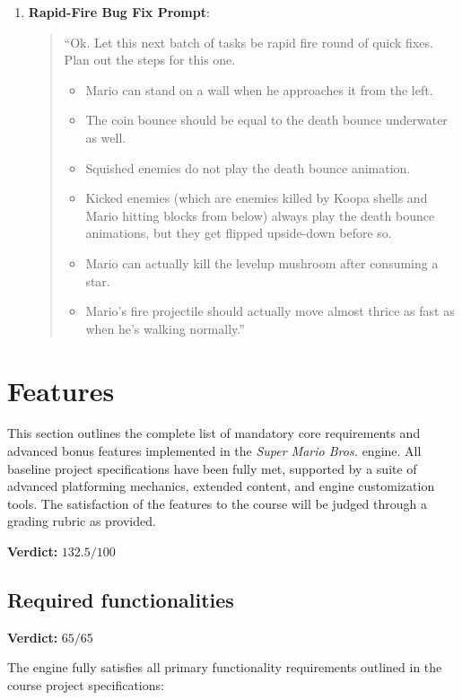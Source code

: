 \documentclass[12pt, a4paper]{article}
\begin{document}
\begin{enumerate}
\item \textbf{Rapid-Fire Bug Fix Prompt}:
\begin{quote}
    ``Ok. Let this next batch of tasks be rapid fire round of quick fixes. Plan out the steps for this one.
    \begin{itemize}
        \item Mario can stand on a wall when he approaches it from the left.
        \item The coin bounce should be equal to the death bounce underwater as well.
        \item Squished enemies do not play the death bounce animation.
        \item Kicked enemies (which are enemies killed by Koopa shells and Mario hitting blocks from below) always play the death bounce animations, but they get flipped upside-down before so.
        \item Mario can actually kill the levelup mushroom after consuming a star.
        \item Mario's fire projectile should actually move almost thrice as fast as when he's walking normally.''
    \end{itemize}
\end{quote}

\end{enumerate}

\newpage

\section{Features}

This section outlines the complete list of mandatory core requirements and advanced bonus features implemented in the \textit{Super Mario Bros.} engine. All baseline project specifications have been fully met, supported by a suite of advanced platforming mechanics, extended content, and engine customization tools. The satisfaction of the features to the course will be judged through a grading rubric as provided.

\textbf{Verdict:} $132.5/100$

\subsection{Required functionalities}

\textbf{Verdict:} $65/65$

The engine fully satisfies all primary functionality requirements outlined in the course project specifications:
\end{document}
